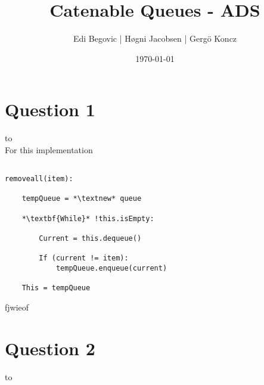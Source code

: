 \documentclass[a4paper]{article}
\title{Catenable Queues - ADS}
\author{Edi Begovic | Høgni Jacobsen | Gergö Koncz}
\date{\today}
\def\headline#1{\hbox to \hsize{\hrulefill\quad\lower.3em\hbox{#1}\quad\hrulefill}}
\begin{document}
 
\maketitle

\section*{Question 1}
\headline{-} \ \\

\noindent
For this implementation 

\begin{lstlisting}[escapeinside={{*}{*}}]

removeall(item):

    tempQueue = *\textnew* queue

    *\textbf{While}* !this.isEmpty:

        Current = this.dequeue()
        
        If (current != item):
            tempQueue.enqueue(current)
    
    This = tempQueue

\end{lstlisting}
fjwieof

\section*{Question 2}
\headline{-} \ \\
\end{document}
